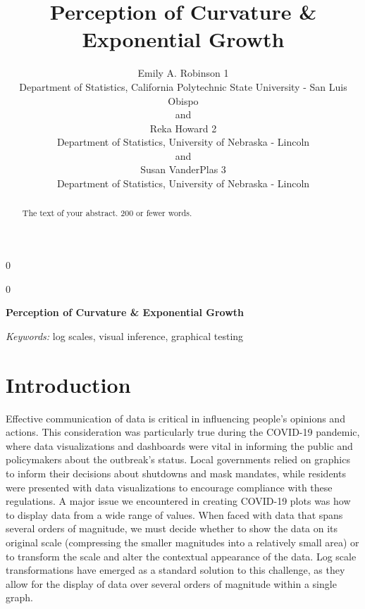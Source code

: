 \documentclass[12pt]{article}
\newcommand{\blind}{0}
\begin{document}
\def\spacingset#1{\renewcommand{\baselinestretch}%
{#1}\small\normalsize} \spacingset{1}



\blind
{
  \title{\bf Perception of Curvature \& Exponential Growth}

  \author{
        Emily A. Robinson 1 \\
    Department of Statistics, California Polytechnic State University -
San Luis Obispo\\
     and \\     Reka Howard 2 \\
    Department of Statistics, University of Nebraska - Lincoln\\
     and \\     Susan VanderPlas 3 \\
    Department of Statistics, University of Nebraska - Lincoln\\
      }
  \maketitle
} \fi

\blind
{
  \bigskip
  \bigskip
  \bigskip
  \begin{center}
    {\LARGE\bf Perception of Curvature \& Exponential Growth}
  \end{center}
  \medskip
} \fi

\bigskip
\begin{abstract}
The text of your abstract. 200 or fewer words.
\end{abstract}

\noindent%
{\it Keywords:} log scales, visual inference, graphical testing
\vfill

\newpage
\spacingset{1.45} %

\hypertarget{introduction}{%
\section{Introduction}\label{introduction}}

Effective communication of data is critical in influencing people's
opinions and actions. This consideration was particularly true during
the COVID-19 pandemic, where data visualizations and dashboards were
vital in informing the public and policymakers about the outbreak's
status. Local governments relied on graphics to inform their decisions
about shutdowns and mask mandates, while residents were presented with
data visualizations to encourage compliance with these regulations. A
major issue we encountered in creating COVID-19 plots was how to display
data from a wide range of values. When faced with data that spans
several orders of magnitude, we must decide whether to show the data on
its original scale (compressing the smaller magnitudes into a relatively
small area) or to transform the scale and alter the contextual
appearance of the data. Log scale transformations have emerged as a
standard solution to this challenge, as they allow for the display of
data over several orders of magnitude within a single graph.
\end{document}
